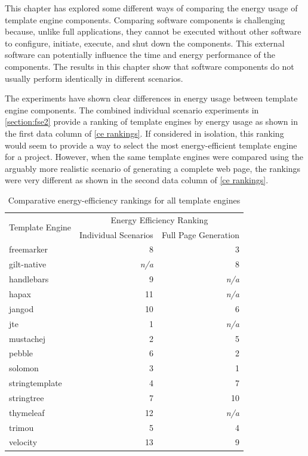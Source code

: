This chapter has explored some different ways of comparing the energy usage of \gls{template engine} components. Comparing software components is challenging because, unlike full applications, they cannot be executed without other software to configure, initiate, execute, and shut down the components. This external software can potentially influence the time and energy performance of the components. The results in this chapter show that software components do not usually perform identically in different scenarios. 

The experiments have shown clear differences in energy usage between \gls{template engine} components. The combined individual scenario experiments in \autoref{section:fse2} provide a ranking of \gls{template engine}s by energy usage as shown in the first data column of \autoref{ce rankings}. If considered in isolation, this ranking would seem to provide a way to select the most energy-efficient \gls{template engine} for a project. However, when the same \gls{template engine}s were compared using the arguably more realistic scenario of generating a complete web page, the rankings were very different as shown in the second data column of \autoref{ce rankings}.

\begin{table}[ht]
\centering
\begin{tabular}{lrr}
\multirow{2}{*}{Template Engine} 
      & \multicolumn{2}{c}{Energy Efficiency Ranking} \\
& Individual Scenarios & Full Page Generation \\
\hline
freemarker & 8 & 3 \\
gilt-native & \emph{n/a} & 8 \\
handlebars & 9 & \emph{n/a} \\
hapax & 11 & \emph{n/a} \\
jangod & 10 & 6 \\
jte & 1 & \emph{n/a} \\
mustachej & 2 & 5 \\
pebble & 6 & 2 \\
solomon & 3 & 1 \\
stringtemplate & 4 & 7 \\
stringtree & 7 & 10 \\
thymeleaf & 12 & \emph{n/a} \\
trimou & 5 & 4 \\
velocity & 13 & 9 \\
\end{tabular}
\caption{Comparative energy-efficiency rankings for all template engines\label{ce rankings}}
\end{table}

